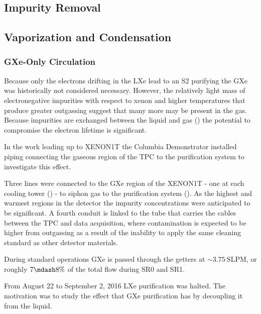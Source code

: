 \subsection{Impurity Removal}
\label{subsec:electron_lifetime_model_removal}



\subsection{Vaporization and Condensation}
\label{subsec:electron_lifetime_model_vap_and_cond}



\subsubsection{GXe-Only Circulation}
\label{subsubsec:electron_lifetime_model_removal_gxe}
Because only the electrons drifting in the LXe lead to an S2 purifying the GXe was historically not considered necessary.  However,
the relatively light mass of electronegative impurities with respect to xenon and higher temperatures that produce greater outgassing
suggest that many more may be present in the gas.  Because
impurities are exchanged between the liquid and gas () the potential to compromise
the electron lifetime is significant.

In the work leading up to XENON1T the Columbia Demonstrator installed piping connecting the gaseous region of the TPC to the purification
system to investigate this effect.

Three lines were connected to the GXe region of the XENON1T - one at each cooling tower
() - to siphon gas to the purification system
().  As the highest and warmest regions in the detector the impurity concentrations were anticipated to be
significant.  A fourth conduit is linked to the tube that carries the cables between the TPC and data acquisition, where contamination
is expected to be higher from outgassing as a result of the inability to apply the same cleaning standard as other detector materials.

During standard operations GXe is passed through the getters at ${\sim} 3.75\ \mathrm{SLPM}$, or roughly $7 \mdash 8\%$ of the total
flow during SR0 and SR1.

From August 22 to September 2, 2016 LXe purification was halted.  The motivation was to study the effect that GXe purification has by
decoupling it from the liquid.



